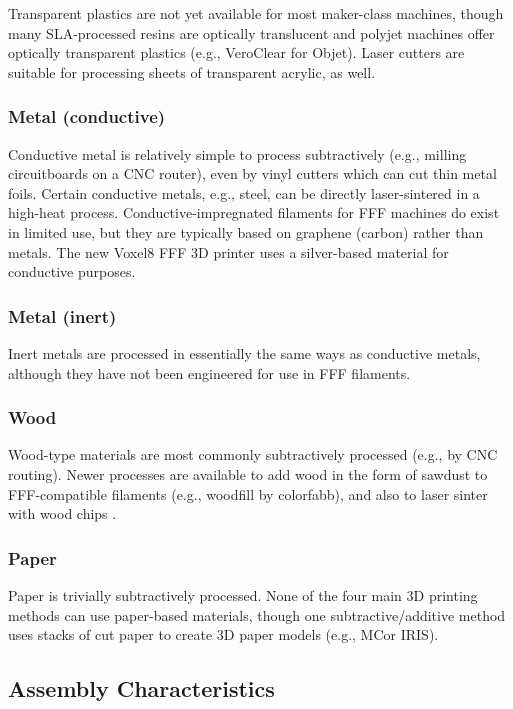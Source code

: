 Transparent plastics are not yet available for most maker-class machines, though many SLA-processed resins are optically translucent and polyjet machines offer optically transparent plastics (e.g., VeroClear for Objet). Laser cutters are suitable for processing sheets of transparent acrylic, as well.

\subsubsection{Metal (conductive)}

Conductive metal is relatively simple to process subtractively (e.g., milling circuitboards on a CNC router), even by vinyl cutters which can cut thin metal foils. Certain conductive metals, e.g., steel, can be directly laser-sintered in a high-heat process. Conductive-impregnated filaments for FFF machines do exist in limited use, but they are typically based on graphene (carbon) rather than metals. The new Voxel8 FFF 3D printer \cite{voxel8} uses a silver-based material for conductive purposes.

\subsubsection{Metal (inert)}

Inert metals are processed in essentially the same ways as conductive metals, although they have not been engineered for use in FFF filaments.

\subsubsection{Wood}

Wood-type materials are most commonly subtractively processed (e.g., by CNC routing). Newer processes are available to add wood in the form of sawdust to FFF-compatible filaments (e.g., woodfill by colorfabb), and also to laser sinter with wood chips \cite{materialise-wood}.

\subsubsection{Paper}

Paper is trivially subtractively processed. None of the four main 3D printing methods can use paper-based materials, though one subtractive/additive method uses stacks of cut paper to create 3D paper models (e.g., MCor IRIS).

\subsection{Assembly Characteristics}

